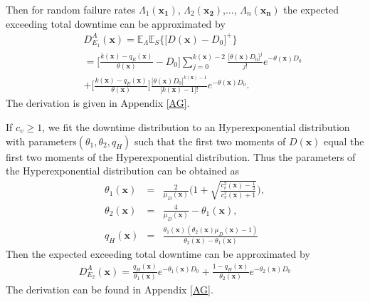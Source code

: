 \documentclass[preprint,12pt]{elsarticle}
\begin{document}
 Then for random failure rates $\Lambda_{1}(\boldsymbol{x_{1}})$, $\Lambda_{2}(\boldsymbol{x_{2}})$,..., $\Lambda_{n}(\boldsymbol{x_{n}})$ the expected exceeding total downtime can be approximated by
\begin{eqnarray}
&&D_{E_{1}}^{A}(\boldsymbol{x})=\mathbb{E}_{\Lambda}\mathbb{E}_{S}\bigg\{\big[D(\boldsymbol{x})-D_{0}\big]^{+}\bigg\} \nonumber\\
&&=\bigg[\frac{k(\boldsymbol{x})-q_{E}(\boldsymbol{x})}{\theta(\boldsymbol{x})}-D_{0}\bigg]\sum_{j=0}^{k(\boldsymbol{x})-2}{\frac{\big[\theta(\boldsymbol{x}) D_{0}\big]^j}{j!}e^{-\theta(\boldsymbol{x})D_{0}}}\nonumber\\
&&+\bigg[\frac{k(\boldsymbol{x})-q_{E}(\boldsymbol{x})}{\theta(\boldsymbol{x})}\bigg]\frac{\big[\theta(\boldsymbol{x})D_{0}\big]^{k(\boldsymbol{x})-1}}{\big[k(\boldsymbol{x})-1\big]!}e^{-\theta(\boldsymbol{x})D_{0}}.
\label{EXD1}
\end{eqnarray}
The derivation is given in Appendix \ref{AG}.


If $c_{v} \geq 1$, we fit the downtime distribution to an Hyperexponential distribution with parameters$(\theta_{1},\theta_{2}, q_{H})$ such that the first two moments of $D(\boldsymbol{x})$ equal the first two moments of the Hyperexponential distribution. Thus the parameters of the Hyperexponential distribution can be obtained as
\begin{eqnarray}
     \theta_{1}(\boldsymbol{x}) &=& \frac{2}{\mu_{D}(\boldsymbol{x})}\bigg(1+\sqrt{\frac{c^{2}_{v}(\boldsymbol{x})-\frac{1}{2}}{c^{2}_{v}(\boldsymbol{x})+1}} \bigg), \label{theta11}\\
     \theta_{2}(\boldsymbol{x}) &=& \frac{4}{\mu_{D}(\boldsymbol{x})} - \theta_{1}(\boldsymbol{x}), \label{theta12}\\
     q_{H}(\boldsymbol{x}) &=& \frac{\theta_1(\boldsymbol{x})(\theta_2(\boldsymbol{x})\mu_{D}(\boldsymbol{x})-1)}{\theta_2(\boldsymbol{x}) -\theta_1(\boldsymbol{x})} \label{q2}
\end{eqnarray}
Then the expected exceeding total downtime can be approximated by
\begin{eqnarray}
D_{E_{2}}^{A}(\boldsymbol{x}) =\frac{q_{H}(\boldsymbol{x})}{\theta_{1}(\boldsymbol{x})} e^{-\theta_{1}(\boldsymbol{x}) D_0 } + \frac{1-q_{H}(\boldsymbol{x})}{\theta_{2}(\boldsymbol{x})} e^{-\theta_{2}(\boldsymbol{x}) D_0} \label{EXD2}
\end{eqnarray}
The derivation can be found in Appendix \ref{AG}.
\end{document}
